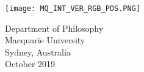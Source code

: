 \begin{titlepage}
\begin{center}
       \texttt{[image: MQ\_INT\_VER\_RGB\_POS.PNG]} %
 
    \large  %
       Department of Philosophy\\
       Macquarie University\\
       Sydney, Australia\\
       October 2019
 
   \end{center} %
\end{titlepage} %
